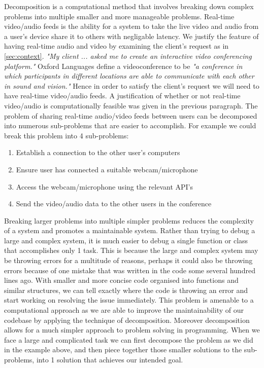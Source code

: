 Decomposition is a computational method that involves breaking
down complex problems into multiple smaller and more 
manageable problems. Real-time video/audio feeds is the ability
for a system to take the live video and audio from a user's 
device share it to others with negligable latency. We justify
the feature of having real-time audio and video by examining 
the client's request as in \ref{sec:context}. \textit{"My 
client ... asked me to create an interactive video conferencing
platform."} Oxford Languages define a videoconference to be 
\textit{"a conference in which participants in different 
locations are able to communicate with each other in sound and
vision."} Hence in order to satisfy the client's request we 
will need to have real-time video/audio feeds. A justification
of whether or not real-time video/audio is computationally 
feasible was given in the previous paragraph.
The problem of sharing real-time audio/video feeds between
users can be decomposed into numerous sub-problems that are
easier to accomplish. For example we could break this problem
into 4 sub-problems:

\begin{enumerate}
  \item Establish a connection to the other user's computers 
  \item Ensure user has connected a suitable webcam/microphone
  \item Access the webcam/microphone using the relevant API's
  \item{Send the video/audio data to the other users in the 
        conference}
\end{enumerate}

Breaking larger problems into multiple simpler problems 
reduces the complexity of a system and promotes a  
maintainable system. Rather than trying to debug a large and
complex system, it is much easier to debug a single function 
or class
that accomplishes only 1 task. This is because the large and 
complex system may be throwing errors for a multitude of 
reasons, perhaps it could also be throwing errors because of
one mistake that was written in the code some several hundred
lines ago. With smaller and more concise code organised into
functions and similar structures, we can tell exactly where the
code is throwing an error and start working on resolving the 
issue immediately. This problem is amenable to a computational 
approach as we are able to improve the maintainability of our
codebase by applying the technique of decomposition. Moreover
decomposition allows for a much simpler approach to problem 
solving in programming. When we face a large and complicated 
task we can first decompose the problem as we did in the 
example above, and then piece together those smaller solutions
to the sub-problems, into 1 solution that achieves our intended
goal. \vspace{0.2cm}

